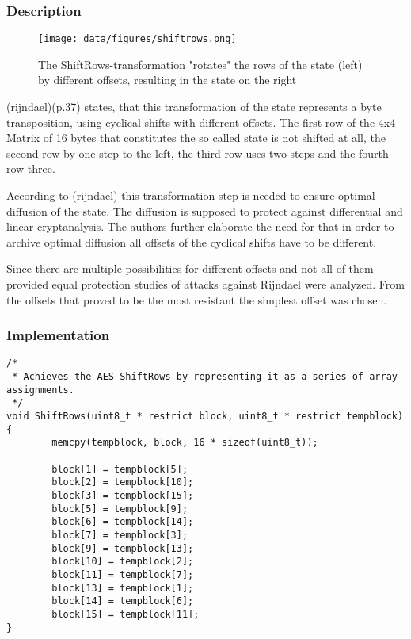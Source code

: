 \hypertarget{description-3}{%
\subsubsection{Description}\label{description-3}}

\begin{figure}
\centering
\texttt{[image: data/figures/shiftrows.png]} 
\caption{The ShiftRows-transformation "rotates" the rows of the state (left) by different offsets, resulting in the state on the right}
\end{figure}

(rijndael)(p.37) states, that this transformation of the state represents a byte transposition, using
cyclical shifts with different offsets. The first row of the 4x4-Matrix
of 16 bytes that constitutes the so called state is not shifted at all,
the second row by one step to the left, the third row uses two steps and
the fourth row three.

According to (rijndael) this transformation step is needed to ensure
optimal diffusion of the state. The diffusion is supposed to protect
against differential and linear cryptanalysis. The authors further
elaborate the need for that in order to archive optimal diffusion all
offsets of the cyclical shifts have to be different.

Since there are multiple possibilities for different offsets and not all
of them provided equal protection studies of attacks against Rijndael
were analyzed. From the offsets that proved to be the most resistant the
simplest offset was chosen.

\hypertarget{implementation-3}{%
\subsubsection{Implementation}\label{implementation-3}}

\begin{lstlisting}
/*
 * Achieves the AES-ShiftRows by representing it as a series of array-assignments.
 */
void ShiftRows(uint8_t * restrict block, uint8_t * restrict tempblock)
{
        memcpy(tempblock, block, 16 * sizeof(uint8_t));

        block[1] = tempblock[5];
        block[2] = tempblock[10];
        block[3] = tempblock[15];
        block[5] = tempblock[9];
        block[6] = tempblock[14];
        block[7] = tempblock[3];
        block[9] = tempblock[13];
        block[10] = tempblock[2];
        block[11] = tempblock[7];
        block[13] = tempblock[1];
        block[14] = tempblock[6];
        block[15] = tempblock[11];
}
\end{lstlisting}

